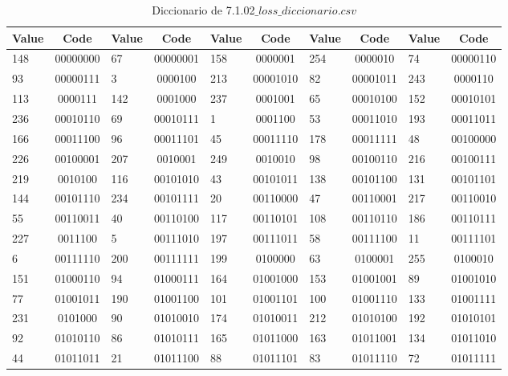 \documentclass[conference,onecolumn,12pt]{IEEEtran}
\numberwithin{equation}{subsection}
\begin{document}
\begin{table}[h]
\centering
\caption{Diccionario de 7.1.02$\_loss\_diccionario.csv$}
\label{tab:loss_dict_compact}
\begin{tabular}{l c l c l c l c l c}
\hline
\scriptsize
\textbf{Value} & \textbf{Code} & \textbf{Value} & \textbf{Code} & \textbf{Value} & \textbf{Code} & \textbf{Value} & \textbf{Code} & \textbf{Value} & \textbf{Code} \\ \hline
148 & 00000000 & 67 & 00000001 & 158 & 0000001 & 254 & 0000010 & 74 & 00000110 \\ \hline
93 & 00000111 & 3 & 0000100 & 213 & 00001010 & 82 & 00001011 & 243 & 0000110 \\ \hline
113 & 0000111 & 142 & 0001000 & 237 & 0001001 & 65 & 00010100 & 152 & 00010101 \\ \hline
236 & 00010110 & 69 & 00010111 & 1 & 0001100 & 53 & 00011010 & 193 & 00011011 \\ \hline
166 & 00011100 & 96 & 00011101 & 45 & 00011110 & 178 & 00011111 & 48 & 00100000 \\ \hline
226 & 00100001 & 207 & 0010001 & 249 & 0010010 & 98 & 00100110 & 216 & 00100111 \\ \hline
219 & 0010100 & 116 & 00101010 & 43 & 00101011 & 138 & 00101100 & 131 & 00101101 \\ \hline
144 & 00101110 & 234 & 00101111 & 20 & 00110000 & 47 & 00110001 & 217 & 00110010 \\ \hline
55 & 00110011 & 40 & 00110100 & 117 & 00110101 & 108 & 00110110 & 186 & 00110111 \\ \hline
227 & 0011100 & 5 & 00111010 & 197 & 00111011 & 58 & 00111100 & 11 & 00111101 \\ \hline
6 & 00111110 & 200 & 00111111 & 199 & 0100000 & 63 & 0100001 & 255 & 0100010 \\ \hline
151 & 01000110 & 94 & 01000111 & 164 & 01001000 & 153 & 01001001 & 89 & 01001010 \\ \hline
77 & 01001011 & 190 & 01001100 & 101 & 01001101 & 100 & 01001110 & 133 & 01001111 \\ \hline
231 & 0101000 & 90 & 01010010 & 174 & 01010011 & 212 & 01010100 & 192 & 01010101 \\ \hline
92 & 01010110 & 86 & 01010111 & 165 & 01011000 & 163 & 01011001 & 134 & 01011010 \\ \hline
44 & 01011011 & 21 & 01011100 & 88 & 01011101 & 83 & 01011110 & 72 & 01011111 \\ \hline

\end{tabular}
\end{table}
\end{document}
